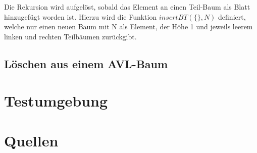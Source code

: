 \documentclass{article}
\begin{document}
	Die Rekursion wird aufgelöst, sobald das Element an einen Teil-Baum als Blatt hinzugefügt worden ist. Hierzu wird die Funktion $insertBT(\{\}, N)$ definiert, welche nur einen neuen Baum mit N als Element, der Höhe 1 und jeweils leerem linken und rechten Teilbäumen zurückgibt.
	
	\subsection{Löschen aus einem AVL-Baum}

  	\newpage
  	\section{Testumgebung}
  
  	\newpage
  	\section{Quellen}
\end{document}
